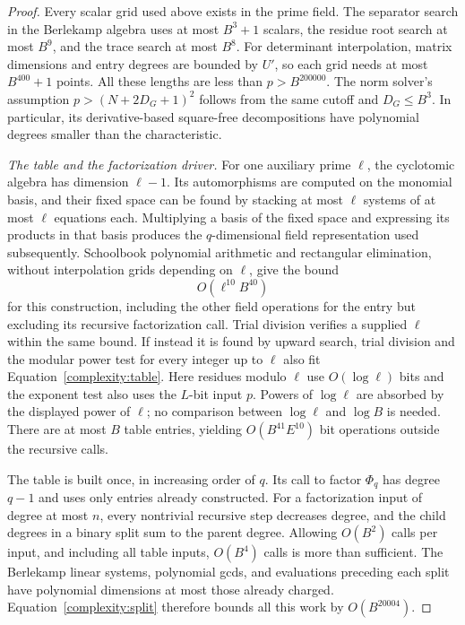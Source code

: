 \begin{proof}
Every scalar grid used above exists in the prime field.  The separator
search in the Berlekamp algebra uses at most $B^3+1$ scalars, the residue
root search at most $B^9$, and the trace search at most $B^8$.
For determinant interpolation, matrix dimensions and entry degrees
are bounded by $U'$, so each grid needs at most $B^{400}+1$ points.
All these lengths are less than $p>B^{200000}$.  The norm solver's
assumption $p>(N+2D_G+1)^2$ follows from the same cutoff and $D_G\le B^3$.
In particular, its derivative-based square-free decompositions have
polynomial degrees smaller than the characteristic.

\smallskip
\noindent\emph{The table and the factorization driver.}
For one auxiliary prime $\ell$, the cyclotomic algebra has dimension
$\ell-1$.  Its automorphisms are computed on the monomial basis, and
their fixed space can be found by stacking at most $\ell$ systems of
at most $\ell$ equations each.  Multiplying a basis of the fixed space
and expressing its products in that basis produces the $q$-dimensional
field representation used subsequently.  Schoolbook polynomial
arithmetic and rectangular elimination, without interpolation grids
depending on $\ell$, give the bound
\begin{equation}
 O(\ell^{10}B^{40})
 \label{complexity:table}
\end{equation}
for this construction, including the other field operations for the
entry but excluding its recursive factorization call.  Trial division
verifies a supplied $\ell$ within the same bound.  If instead it is
found by upward search, trial division and the modular power test for
every integer up to $\ell$ also fit Equation~\eqref{complexity:table}.
Here residues modulo $\ell$ use $O(\log\ell)$ bits and the exponent
test also uses the $L$-bit input $p$.  Powers of $\log\ell$ are absorbed
by the displayed power of $\ell$; no comparison between $\log\ell$
and $\log B$ is needed.  There are at most $B$ table entries, yielding
$O(B^{41}E^{10})$ bit operations outside the recursive calls.

The table is built once, in increasing order of $q$.  Its call to factor
$\Phi_q$ has degree $q-1$ and uses only entries already constructed.
For a factorization input of degree at most $n$, every nontrivial
recursive step decreases degree, and the child degrees in a binary
split sum to the parent degree.  Allowing $O(B^2)$ calls per input,
and including all table inputs, $O(B^4)$ calls is more than sufficient.
The Berlekamp linear systems, polynomial gcds, and evaluations preceding
each split have polynomial dimensions at most those already charged.
Equation~\eqref{complexity:split} therefore bounds all this work by
$O(B^{20004})$.


\end{proof}
